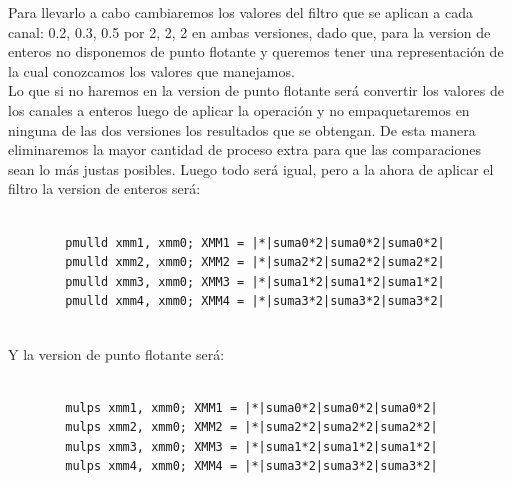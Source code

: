 Para llevarlo a cabo cambiaremos los valores del filtro que se aplican a cada canal: 0.2, 0.3, 0.5 por 2, 2, 2 en ambas versiones, dado que, para la version de enteros no disponemos de punto flotante y queremos tener una representación de la cual conozcamos los valores que manejamos.\\
Lo que si no haremos en la version de punto flotante será convertir los valores de los canales a enteros luego de aplicar la operación y no empaquetaremos en ninguna de las dos versiones los resultados que se obtengan. De esta manera eliminaremos la mayor cantidad de proceso extra para que las comparaciones sean lo más justas posibles.  
Luego todo será igual, pero a la ahora de aplicar el filtro la version de enteros será:\\

\begin{codesnippet}
\begin{verbatim}
                
		pmulld xmm1, xmm0; XMM1 = |*|suma0*2|suma0*2|suma0*2|  
		pmulld xmm2, xmm0; XMM2 = |*|suma2*2|suma2*2|suma2*2|  
		pmulld xmm3, xmm0; XMM3 = |*|suma1*2|suma1*2|suma1*2|   
		pmulld xmm4, xmm0; XMM4 = |*|suma3*2|suma3*2|suma3*2|   
                
\end{verbatim}
\end{codesnippet}

Y la version de punto flotante será:

\begin{codesnippet}
\begin{verbatim}

		mulps xmm1, xmm0; XMM1 = |*|suma0*2|suma0*2|suma0*2|  
		mulps xmm2, xmm0; XMM2 = |*|suma2*2|suma2*2|suma2*2|  
		mulps xmm3, xmm0; XMM3 = |*|suma1*2|suma1*2|suma1*2|  
		mulps xmm4, xmm0; XMM4 = |*|suma3*2|suma3*2|suma3*2|     

\end{verbatim}
\end{codesnippet}
